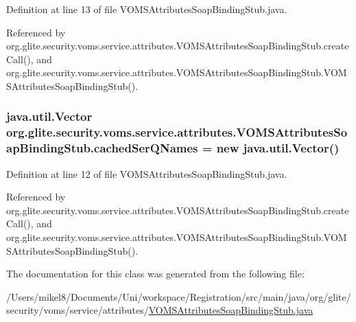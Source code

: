 Definition at line 13 of file VOMSAttributesSoapBindingStub.java.



Referenced by org.glite.security.voms.service.attributes.VOMSAttributesSoapBindingStub.createCall(), and org.glite.security.voms.service.attributes.VOMSAttributesSoapBindingStub.VOMSAttributesSoapBindingStub().

\hypertarget{classorg_1_1glite_1_1security_1_1voms_1_1service_1_1attributes_1_1VOMSAttributesSoapBindingStub_ad61123f5e69ee7faed6313158367e47b}{
\subsubsection[{cachedSerQNames}]{\setlength{\rightskip}{0pt plus 5cm}java.util.Vector {\bf org.glite.security.voms.service.attributes.VOMSAttributesSoapBindingStub.cachedSerQNames} = new java.util.Vector()}}
\label{classorg_1_1glite_1_1security_1_1voms_1_1service_1_1attributes_1_1VOMSAttributesSoapBindingStub_ad61123f5e69ee7faed6313158367e47b}


Definition at line 12 of file VOMSAttributesSoapBindingStub.java.



Referenced by org.glite.security.voms.service.attributes.VOMSAttributesSoapBindingStub.createCall(), and org.glite.security.voms.service.attributes.VOMSAttributesSoapBindingStub.VOMSAttributesSoapBindingStub().



The documentation for this class was generated from the following file:\begin{DoxyCompactItemize}
\item 
/Users/mikel8/Documents/Uni/workspace/Registration/src/main/java/org/glite/security/voms/service/attributes/\hyperlink{VOMSAttributesSoapBindingStub_8java}{VOMSAttributesSoapBindingStub.java}\end{DoxyCompactItemize}
